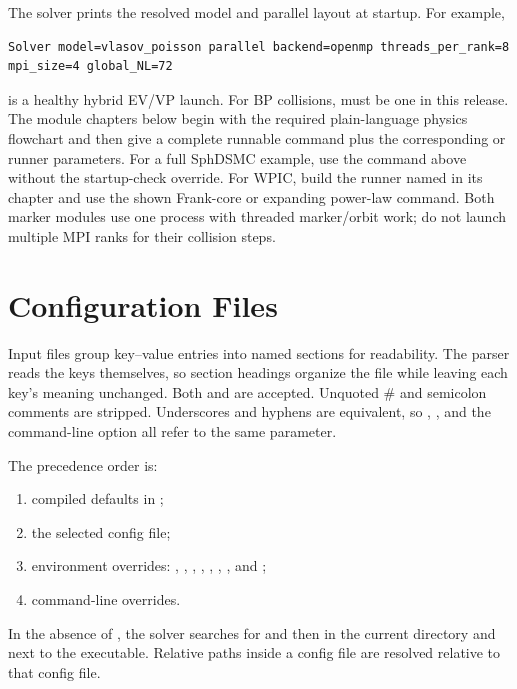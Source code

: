 The solver prints the resolved model and parallel layout at startup.  For
example,
\begin{lstlisting}
Solver model=vlasov_poisson parallel backend=openmp threads_per_rank=8 mpi_size=4 global_NL=72
\end{lstlisting}
is a healthy hybrid EV/VP launch.  For BP collisions,  must be
one in this release.
\else
The module chapters below begin with the required plain-language physics
flowchart and then give a complete runnable command plus the corresponding
 or runner parameters.  For a full SphDSMC example, use the
command above without the  startup-check override.  For WPIC, build the
runner named in its chapter and use the shown Frank-core or expanding
    power-law command.  Both marker modules use one process with threaded
marker/orbit work; do not launch multiple MPI ranks for their collision steps.
\fi

\section{Configuration Files}

Input files group key--value entries into named sections for readability.
The parser reads the keys themselves, so section headings organize the file
while leaving each key's meaning unchanged.  Both  and
 are accepted.  Unquoted \# and semicolon comments are
stripped.  Underscores and hyphens are equivalent, so
, , and the command-line
option  all refer to the same parameter.

The precedence order is:
\begin{enumerate}
\item compiled defaults in ;
\item the selected config file;
\item environment overrides: , ,
, , ,
, , and
;
\item command-line overrides.
\end{enumerate}
In the absence of , the solver searches for
 and then  in the current directory and
next to the executable.  Relative paths inside a config file are resolved
relative to that config file.

